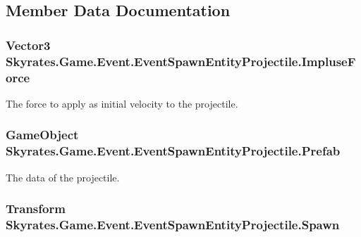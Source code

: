 \subsection{Member Data Documentation}
\hypertarget{class_skyrates_1_1_game_1_1_event_1_1_event_spawn_entity_projectile_ab5cdafc2c74cc74101cf8a8ce825ccbd}{
\subsubsection[{Impluse\-Force}]{\setlength{\rightskip}{0pt plus 5cm}Vector3 Skyrates.\-Game.\-Event.\-Event\-Spawn\-Entity\-Projectile.\-Impluse\-Force}}\label{class_skyrates_1_1_game_1_1_event_1_1_event_spawn_entity_projectile_ab5cdafc2c74cc74101cf8a8ce825ccbd}


The force to apply as initial velocity to the projectile. 

\hypertarget{class_skyrates_1_1_game_1_1_event_1_1_event_spawn_entity_projectile_a721e20a22540f3731523cf87a76661f0}{
\subsubsection[{Prefab}]{\setlength{\rightskip}{0pt plus 5cm}Game\-Object Skyrates.\-Game.\-Event.\-Event\-Spawn\-Entity\-Projectile.\-Prefab}}\label{class_skyrates_1_1_game_1_1_event_1_1_event_spawn_entity_projectile_a721e20a22540f3731523cf87a76661f0}


The data of the projectile. 

\hypertarget{class_skyrates_1_1_game_1_1_event_1_1_event_spawn_entity_projectile_acc1064c2d3d99193935db2d8082c692e}{
\subsubsection[{Spawn}]{\setlength{\rightskip}{0pt plus 5cm}Transform Skyrates.\-Game.\-Event.\-Event\-Spawn\-Entity\-Projectile.\-Spawn}}\label{class_skyrates_1_1_game_1_1_event_1_1_event_spawn_entity_projectile_acc1064c2d3d99193935db2d8082c692e}


